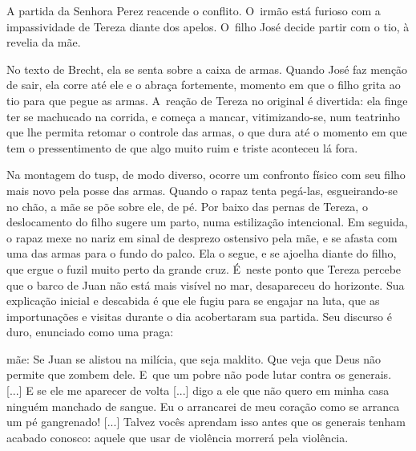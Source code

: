 A partida da Senhora Perez reacende o conflito. O~irmão está furioso com
a impassividade de Tereza diante dos apelos. O~filho José decide partir
com o tio, à revelia da mãe.

No texto de Brecht, ela se senta sobre a caixa de armas. Quando José faz
menção de sair, ela corre até ele e o abraça fortemente, momento em que
o filho grita ao tio para que pegue as armas. A~reação de Tereza no
original é divertida: ela finge ter se machucado na corrida, e começa a
mancar, vitimizando-se, num teatrinho que lhe permita retomar o controle
das armas, o que dura até o momento em que tem o pressentimento de que algo
muito ruim e triste aconteceu lá fora.

Na montagem do {\sc tusp}, de modo diverso, ocorre um confronto físico com seu
filho mais novo pela posse das armas. Quando o rapaz tenta pegá-las,
esgueirando-se no chão, a mãe se põe sobre ele, de pé. Por baixo das
pernas de Tereza, o deslocamento do filho sugere um parto, numa
estilização intencional. Em seguida, o rapaz mexe no nariz em sinal de
desprezo ostensivo pela mãe, e se afasta com uma das armas para o fundo
do palco. Ela o segue, e se ajoelha diante do filho, que ergue o fuzil
muito perto da grande cruz. É~neste ponto que Tereza percebe que o barco
de Juan não está mais visível no mar, desapareceu do horizonte. Sua
explicação inicial e descabida é que ele fugiu para se engajar na luta,
que as importunações e visitas durante o dia acobertaram sua partida.
Seu discurso é duro, enunciado como uma praga:

\startblockquote
{\sc mãe}: Se Juan se alistou na milícia, que seja maldito. Que veja que Deus
não permite que zombem dele. E~que um pobre não pode lutar contra os
generais. {[}...{]} E se ele me aparecer de volta {[}...{]} digo a ele
que não quero em minha casa ninguém manchado de sangue. Eu o arrancarei
de meu coração como se arranca um pé gangrenado! {[}...{]} Talvez vocês
aprendam isso antes que os generais tenham acabado conosco: aquele que
usar de violência morrerá pela violência.
\stopblockquote



